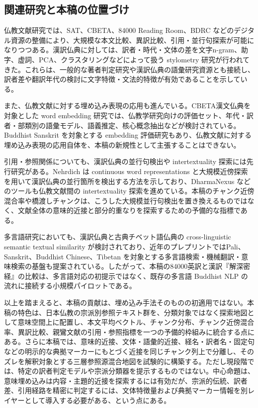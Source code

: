 \documentclass[uplatex,dvipdfmx,11pt,a4paper]{jsarticle}
\begin{document}
\subsection{関連研究と本稿の位置づけ}

仏教文献研究では、SAT、CBETA、84000 Reading Room、BDRC などのデジタル資源の整備により、大規模な本文比較、異訳比較、引用・並行句探索が可能になりつつある\cite{sat,cbeta,bdrc,84000-toh106}。漢訳仏典に対しては、訳者・時代・文体の差を文字n-gram、助字、虚詞、PCA、クラスタリングなどによって扱う stylometry 研究が行われてきた\cite{hung2010,bingenheimer2017}。これらは、一般的な著者判定研究\cite{burrows2002,koppel2009}や漢訳仏典の語彙研究資源\cite{karashima2001}とも接続し、訳者差や翻訳年代の検討に文字特徴・文法的特徴が有効であることを示している。

また、仏教文献に対する埋め込み表現の応用も進んでいる。CBETA漢文仏典を対象とした word embedding 研究では、仏教学研究向けの評価セット、年代・訳者・部類別の語彙モデル、語義推定、核心概念抽出などが検討されている\cite{huang2023}。Buddhist Sanskrit を対象とする embedding 評価研究もあり\cite{lugli2022}、仏教文献に対する埋め込み表現の応用自体を、本稿の新規性として主張することはできない。

引用・参照関係についても、漢訳仏典の並行句検出や intertextuality 探索には先行研究がある。Nehrdich は continuous word representations と大規模近傍探索を用いて漢訳仏典の並行箇所を検出する方法を示しており\cite{nehrdich2020}、DharmaNexus などのツールも仏教文献間の intertextuality 探索を進めている\cite{dharmanexus}。本稿のチャンク近傍混合率や橋渡しチャンクは、こうした大規模並行句検出を置き換えるものではなく、文献全体の意味的近接と部分的重なりを探索するための予備的な指標である。

多言語研究においても、漢訳仏典と古典チベット語仏典の cross-linguistic semantic textual similarity が検討されており\cite{felbur2022}、近年のプレプリントではPali、Sanskrit、Buddhist Chinese、Tibetan を対象とする多言語検索・機械翻訳・意味検索の基盤も提案されている\cite{mitra2026}。したがって、本稿の84000英訳と漢訳『解深密経』の比較は、多言語対応の初提示ではなく、既存の多言語 Buddhist NLP の流れに接続する小規模パイロットである。

以上を踏まえると、本稿の貢献は、埋め込み手法そのものの初適用ではない。本稿の特色は、日本仏教の宗派別参照テキスト群を、分類対象ではなく探索地図として意味空間上に配置し、本文平均ベクトル、チャンク分布、チャンク近傍混合率、異訳比較、親鸞文献の引用・参照指標を一つの予備的枠組みに統合する点にある。さらに本稿では、意味的近接、文体・語彙的近接、経名・訳者名・固定句などの明示的な典拠マーカーにもとづく近接を同じチャンク列上で分離し、そのズレを解釈対象とする三層参照源混合地図を試験的に構築する。ただし現段階では、特定の訳者判定モデルや宗派分類器を提示するものではない。中心命題は、意味埋め込みは内容・主題的近接を探索するには有効だが、宗派的伝統、訳者差、引用経路を精密に判定するには、文体特徴量および典拠マーカー情報を別レイヤーとして導入する必要がある、という点にある。
\end{document}
